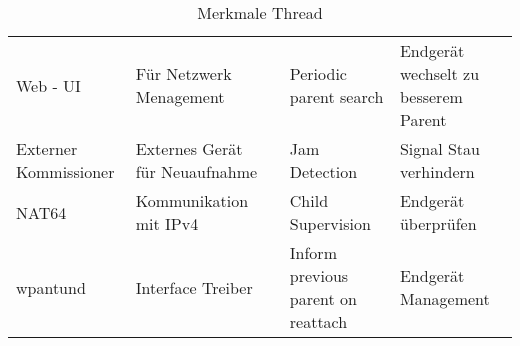 \begin{table}[H]
\begin{adjustbox}{width=1\textwidth}
\begin{tabular}{@{}lllll@{}}
		\multicolumn{1}{|l|}{Web - UI}              & \multicolumn{1}{l|}{Für Netzwerk Menagement}           & \multicolumn{1}{l|}{} & \multicolumn{1}{l|}{Periodic parent search}             & \multicolumn{1}{l|}{Endgerät wechselt zu besserem Parent} \\ \cmidrule(r){1-2} \cmidrule(l){4-5} 
		\multicolumn{1}{|l|}{Externer Kommissioner} & \multicolumn{1}{l|}{Externes Gerät für Neuaufnahme}    & \multicolumn{1}{l|}{} & \multicolumn{1}{l|}{Jam Detection}                      & \multicolumn{1}{l|}{Signal Stau verhindern}               \\ \cmidrule(r){1-2} \cmidrule(l){4-5} 
		\multicolumn{1}{|l|}{NAT64}                 & \multicolumn{1}{l|}{Kommunikation mit IPv4}            & \multicolumn{1}{l|}{} & \multicolumn{1}{l|}{Child Supervision}                  & \multicolumn{1}{l|}{Endgerät überprüfen}                  \\ \cmidrule(r){1-2} \cmidrule(l){4-5} 
		\multicolumn{1}{|l|}{wpantund}              & \multicolumn{1}{l|}{Interface Treiber}                 & \multicolumn{1}{l|}{} & \multicolumn{1}{l|}{Inform previous parent on reattach} & \multicolumn{1}{l|}{Endgerät Management}                  \\ \cmidrule(r){1-2} \cmidrule(l){4-5} 
	\end{tabular}
	\end{adjustbox}
	\caption{Merkmale Thread \cite{thread_group_what_2020}}
	\label{table:MerkmaleThread}
\end{table}

